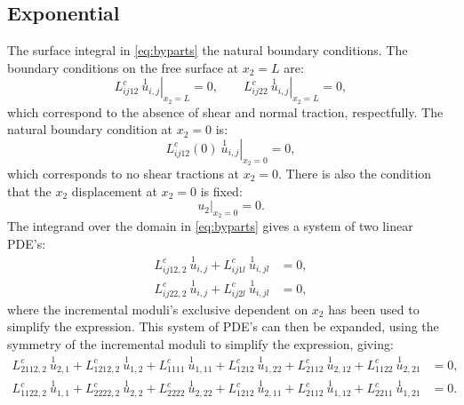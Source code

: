 \documentclass[11pt]{report}
\begin{document}
\begin{appendices}
\section{Exponential}
The surface integral in \eqref{eq:byparts} the natural boundary conditions. The boundary conditions on the free surface at $x_2 = L$ are:
\begin{equation} \label{eq:bcAtL}
\left . L^c_{ij12} \: \overset{1}{u}_{i,j} \right |_{x_2 = L} = 0, \qquad
\left . L^c_{ij22} \: \overset{1}{u}_{i,j} \right |_{x_2 = L} = 0,
\end{equation}
which correspond to the absence of shear and normal traction, respectfully. The natural boundary condition at $x_2 = 0$ is:
\begin{equation} \label{eq:shearAt0}
\left . L^c_{ij12}(0) \: \overset{1}{u}_{i, j}  \right |_{x_2 = 0} = 0,
\end{equation}
which corresponds to no shear tractions at $x_2 = 0$. There is also the condition that the $x_2$ displacement at $x_2 = 0$ is fixed:
\begin{equation} \label{eq:dispAt0}
\left . u_2 \right |_{x_2 = 0} = 0 .
\end{equation}
The integrand over the domain in \eqref{eq:byparts} gives a system of two linear PDE's:
\begin{equation}
\begin{aligned}
L^c_{ij12,2} \: \overset{1}{u}_{i,j} + L^c_{ij1l} \: \overset{1}{u}_{i,jl} &= 0, \\
L^c_{ij22,2} \: \overset{1}{u}_{i,j} + L^c_{ij2l} \: \overset{1}{u}_{i,jl} &= 0 ,
\end{aligned}
\end{equation}
where the incremental moduli's exclusive dependent on $x_2$ has been used to simplify the expression. This system of PDE's can then be expanded, using the symmetry of the incremental moduli to simplify the expression, giving:
\begin{equation} \label{eq:rawpde}
\begin{aligned}
L^c_{2112,2} \: \overset{1}{u}_{2,1} + L^c_{1212,2} \: \overset{1}{u}_{1,2} + L^c_{1111} \: \overset{1}{u}_{1,11} + L^c_{1212} \: \overset{1}{u}_{1,22}+ L^c_{2112} \: \overset{1}{u}_{2,12}  + L^c_{1122} \: \overset{1}{u}_{2,21} &= 0, \\
L^c_{1122,2} \: \overset{1}{u}_{1,1} + L^c_{2222,2} \: \overset{1}{u}_{2,2} + L^c_{2222} \: \overset{1}{u}_{2,22}+ L^c_{1212} \: \overset{1}{u}_{2,11}+ L^c_{2112} \: \overset{1}{u}_{1,12}  + L^c_{2211} \: \overset{1}{u}_{1,21} &= 0.

\end{aligned}
\end{equation}
\end{appendices}
\end{document}
